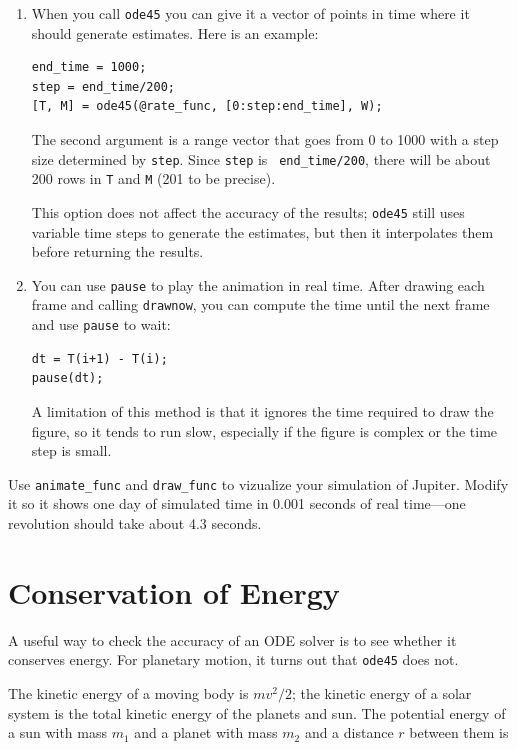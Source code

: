 \documentclass{book}
\begin{document}
\begin{enumerate}

\item When you call {\tt ode45} you can give it a vector of
points in time where it should generate estimates.  Here is
an example:

\begin{verbatim}
end_time = 1000;
step = end_time/200;
[T, M] = ode45(@rate_func, [0:step:end_time], W);
\end{verbatim}

The second argument is a range vector that goes from 0 to 1000 with a
step size determined by {\tt step}.  Since {\tt step} is {\tt
end\_time/200}, there will be about 200 rows in {\tt T} and {\tt M}
(201 to be precise).

This option does not affect the accuracy of the results; {\tt ode45}
still uses variable time steps to generate the estimates, but then it
interpolates them before returning the results.

\item You can use {\tt pause} to play the animation in
real time.  After drawing each frame and calling
{\tt drawnow}, you can compute the time
until the next frame and use {\tt pause} to wait:

\begin{verbatim}
dt = T(i+1) - T(i);
pause(dt);
\end{verbatim}

A limitation of this method is that it ignores the time required to
draw the figure, so it tends to run slow, especially if the figure is
complex or the time step is small.

\end{enumerate}

\begin{ex}
Use {\tt animate\_func} and {\tt draw\_func} to vizualize your
simulation of Jupiter.  Modify it so it shows one day of simulated
time in 0.001 seconds of real time---one revolution should take
about 4.3 seconds.
\end{ex}


\section{Conservation of Energy}

A useful way to check the accuracy of an ODE solver is to
see whether it conserves energy.  For planetary
motion, it turns out that {\tt ode45} does not.

The kinetic energy of a moving body is $m v^2 / 2$; the
kinetic energy of a solar system is the total kinetic
energy of the planets and sun.
The potential energy of a sun with mass $m_1$ and a
planet with mass $m_2$ and a distance $r$ between them is
\end{document}
